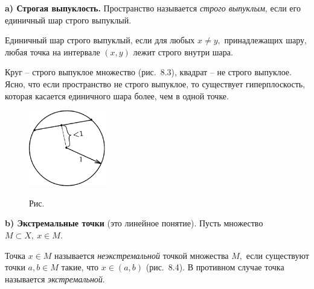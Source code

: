  {\bf \normalsize   a) Строгая выпуклость.} Пространство называется {\it строго выпуклым},
 если его единичный шар строго выпуклый.

 Единичный шар строго выпуклый, если для любых $x\ne y,$ принадлежащих шару, любая точка
 на интервале $(x,y)$
 лежит строго внутри шара.

 \begin{Example} %
 Круг -- строго выпуклое множество (рис.~8.3), квадрат -- не строго
 выпуклое. Ясно, что если пространство не строго выпуклое,
 то существует гиперплоскость, которая касается единичного
 шара более, чем в одной точке.

 \vspace{0.5cm}
 \begin{figure}[ht]
\begin{center}
\includegraphics[width=0.3\textwidth]{pict08-3.eps}
\end{center}
 \bigskip
 \label{r8-3}

 \centerline{Рис.~\theris}
 \bigskip
\end{figure}
 \end{Example}

 {\bf \normalsize b) Экстремальные точки} {(это линейное понятие).}
 Пусть множество $M\subset X,~ x\in M.$

 Точка $x\in M$ называется {\it неэкстремальной} точкой множества $M,$
 если существуют точки $a,b\in M$ такие, что $x\in (a,b)$
 (рис.~8.4). В противном случае точка называется {\it экстремальной}.


